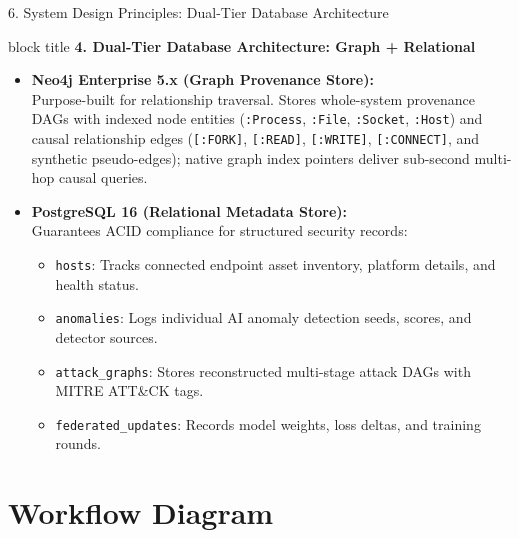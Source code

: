 \documentclass[aspectratio=169,10pt]{beamer}
\begin{document}
\begin{frame}{6. System Design Principles: Dual-Tier Database Architecture}
\vspace{0.2em}
\begin{beamercolorbox}[rounded=true,shadow=false,sep=0.38em,wd=\textwidth]{block title}
\textbf{\scriptsize 4. Dual-Tier Database Architecture: Graph + Relational}
\end{beamercolorbox}
\vspace{0.2em}
{\fontsize{7.6pt}{11.0pt}\selectfont
\begin{itemize}\itemsep0.32em
  \item \textbf{Neo4j Enterprise 5.x (Graph Provenance Store):}\\
  Purpose-built for relationship traversal. Stores whole-system provenance DAGs with indexed node entities (\texttt{:Process}, \texttt{:File}, \texttt{:Socket}, \texttt{:Host}) and causal relationship edges (\texttt{[:FORK]}, \texttt{[:READ]}, \texttt{[:WRITE]}, \texttt{[:CONNECT]}, and synthetic pseudo-edges); native graph index pointers deliver sub-second multi-hop causal queries.
  \item \textbf{PostgreSQL 16 (Relational Metadata Store):}\\
  Guarantees ACID compliance for structured security records:
  \begin{itemize}\itemsep0.15em
    \item \texttt{hosts}: Tracks connected endpoint asset inventory, platform details, and health status.
    \item \texttt{anomalies}: Logs individual AI anomaly detection seeds, scores, and detector sources.
    \item \texttt{attack\_graphs}: Stores reconstructed multi-stage attack DAGs with MITRE ATT\&CK tags.
    \item \texttt{federated\_updates}: Records model weights, loss deltas, and training rounds.
  \end{itemize}
\end{itemize}
}
\end{frame}

\section{Workflow Diagram}
\end{document}

